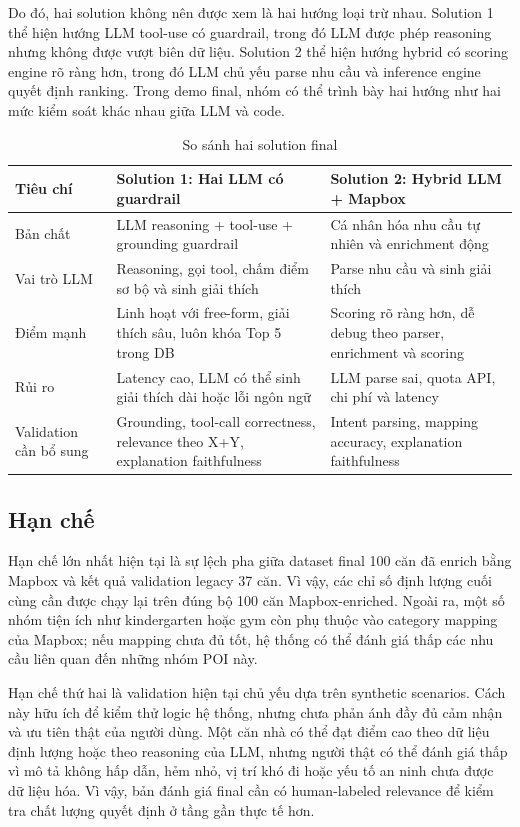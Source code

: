 \documentclass[a4paper,12pt]{article}
\begin{document}
Do đó, hai solution không nên được xem là hai hướng loại trừ nhau. Solution 1 thể hiện hướng LLM tool-use có guardrail, trong đó LLM được phép reasoning nhưng không được vượt biên dữ liệu. Solution 2 thể hiện hướng hybrid có scoring engine rõ ràng hơn, trong đó LLM chủ yếu parse nhu cầu và inference engine quyết định ranking. Trong demo final, nhóm có thể trình bày hai hướng như hai mức kiểm soát khác nhau giữa LLM và code.

\begin{table}[H]
\centering
\caption{So sánh hai solution final}
\label{tab:solution_comparison}
\small
\begin{tabularx}{\textwidth}{|P{3.0cm}|Y|Y|}
\hline
\textbf{Tiêu chí} & \textbf{Solution 1: Hai LLM có guardrail} & \textbf{Solution 2: Hybrid LLM + Mapbox} \\ \hline
Bản chất & LLM reasoning + tool-use + grounding guardrail & Cá nhân hóa nhu cầu tự nhiên và enrichment động \\ \hline
Vai trò LLM & Reasoning, gọi tool, chấm điểm sơ bộ và sinh giải thích & Parse nhu cầu và sinh giải thích \\ \hline
Điểm mạnh & Linh hoạt với free-form, giải thích sâu, luôn khóa Top 5 trong DB & Scoring rõ ràng hơn, dễ debug theo parser, enrichment và scoring \\ \hline
Rủi ro & Latency cao, LLM có thể sinh giải thích dài hoặc lỗi ngôn ngữ & LLM parse sai, quota API, chi phí và latency \\ \hline
Validation cần bổ sung & Grounding, tool-call correctness, relevance theo X+Y, explanation faithfulness & Intent parsing, mapping accuracy, explanation faithfulness \\ \hline
\end{tabularx}
\end{table}

\subsection{Hạn chế}
Hạn chế lớn nhất hiện tại là sự lệch pha giữa dataset final 100 căn đã enrich bằng Mapbox và kết quả validation legacy 37 căn. Vì vậy, các chỉ số định lượng cuối cùng cần được chạy lại trên đúng bộ 100 căn Mapbox-enriched. Ngoài ra, một số nhóm tiện ích như kindergarten hoặc gym còn phụ thuộc vào category mapping của Mapbox; nếu mapping chưa đủ tốt, hệ thống có thể đánh giá thấp các nhu cầu liên quan đến những nhóm POI này.

Hạn chế thứ hai là validation hiện tại chủ yếu dựa trên synthetic scenarios. Cách này hữu ích để kiểm thử logic hệ thống, nhưng chưa phản ánh đầy đủ cảm nhận và ưu tiên thật của người dùng. Một căn nhà có thể đạt điểm cao theo dữ liệu định lượng hoặc theo reasoning của LLM, nhưng người thật có thể đánh giá thấp vì mô tả không hấp dẫn, hẻm nhỏ, vị trí khó đi hoặc yếu tố an ninh chưa được dữ liệu hóa. Vì vậy, bản đánh giá final cần có human-labeled relevance để kiểm tra chất lượng quyết định ở tầng gần thực tế hơn.
\end{document}
